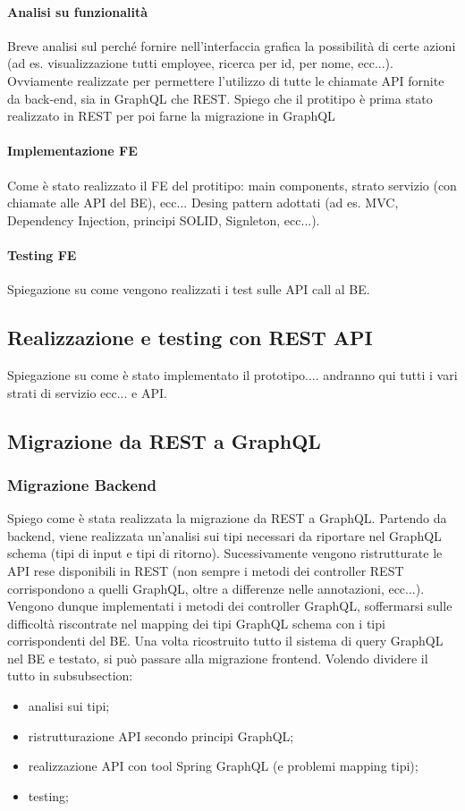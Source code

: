 \paragraph{Analisi su funzionalità}
Breve analisi sul perché fornire nell'interfaccia grafica la possibilità di certe azioni (ad es. visualizzazione tutti employee, ricerca per id, per nome, ecc...). Ovviamente realizzate per permettere l'utilizzo di tutte le chiamate API fornite da back-end, sia in GraphQL che REST. Spiego che il protitipo è prima stato realizzato in REST per poi farne la migrazione in GraphQL
\paragraph{Implementazione FE}
Come è stato realizzato il FE del protitipo: main components, strato servizio (con chiamate alle API del BE), ecc...
Desing pattern adottati (ad es. MVC, Dependency Injection, principi SOLID, Signleton, ecc...).
\paragraph{Testing FE}
Spiegazione su come vengono realizzati i test sulle API call al BE.
\subsection{Realizzazione e testing con REST API}
Spiegazione su come è stato implementato il prototipo.... andranno qui tutti i vari strati di servizio ecc... e API.







\subsection{Migrazione da REST a GraphQL}
\subsubsection*{Migrazione Backend}
Spiego come è stata realizzata la migrazione da REST a GraphQL. Partendo da backend, viene realizzata un'analisi sui tipi necessari da riportare nel GraphQL schema (tipi di input e tipi di ritorno). Sucessivamente vengono ristrutturate le API rese disponibili in REST (non sempre i metodi dei controller REST corrispondono a quelli GraphQL, oltre a differenze nelle annotazioni, ecc...). Vengono dunque implementati i metodi dei controller GraphQL, soffermarsi sulle difficoltà riscontrate nel mapping dei tipi GraphQL schema con i tipi corrispondenti del BE. Una volta ricostruito tutto il sistema di query GraphQL nel BE e testato, si può passare alla migrazione frontend. Volendo dividere il tutto in subsubsection:
\begin{itemize}
  \item analisi sui tipi;
  \item ristrutturazione API secondo principi GraphQL;
  \item realizzazione API con tool Spring GraphQL (e problemi mapping tipi);
  \item testing;
\end{itemize}
